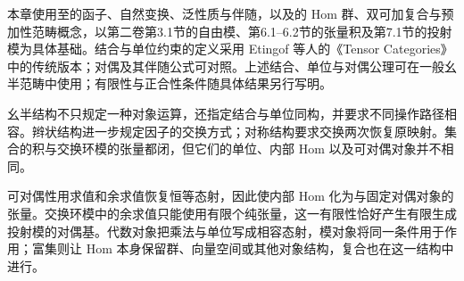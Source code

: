 本章使用至的函子、自然变换、泛性质与伴随，以及的 Hom 群、双可加复合与预加性范畴概念，以第二卷第3.1节的自由模、第6.1--6.2节的张量积及第7.1节的投射模为具体基础。结合与单位约束的定义采用 Etingof 等人的《Tensor Categories》中的传统版本\cite[Definition 2.2.8, p. 25]{EtingofEtAl2015TensorCategories}；对偶及其伴随公式可对照\cite[Section 2.10, pp. 40--43, especially Proposition 2.10.8]{EtingofEtAl2015TensorCategories}。上述结合、单位与对偶公理可在一般幺半范畴中使用；有限性与正合性条件随具体结果另行写明。






\begin{chaptersummary}
	幺半结构不只规定一种对象运算，还指定结合与单位同构，并要求不同操作路径相容。辫状结构进一步规定因子的交换方式；对称结构要求交换两次恢复原映射。集合的积与交换环模的张量都闭，但它们的单位、内部 Hom 以及可对偶对象并不相同。

	\ProseParagraphBreak

	可对偶性用求值和余求值恢复恒等态射，因此使内部 Hom 化为与固定对偶对象的张量。交换环模中的余求值只能使用有限个纯张量，这一有限性恰好产生有限生成投射模的对偶基。代数对象把乘法与单位写成相容态射，模对象将同一条件用于作用；富集则让 Hom 本身保留群、向量空间或其他对象结构，复合也在这一结构中进行。
\end{chaptersummary}

\BookExercises

